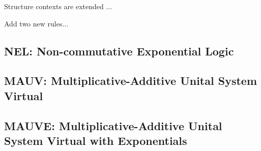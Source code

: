 Structure contexts are extended ...

Add two new rules...



\subsection{NEL: Non-commutative Exponential Logic}
\label{sec:nel-calculus}

\subsection{MAUV: Multiplicative-Additive Unital System Virtual}
\label{sec:mauv-calculus}

\subsection{MAUVE: Multiplicative-Additive Unital System Virtual with Exponentials}
\label{sec:mauve-calculus}

